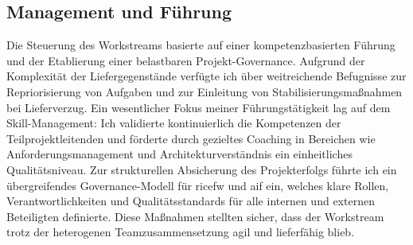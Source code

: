 \subsection{Management und Führung}
\label{subsec:ManagementUndFührung}

\par Die Steuerung des Workstreams basierte auf einer kompetenzbasierten Führung und der Etablierung einer belastbaren Projekt-Governance. Aufgrund der Komplexität der Liefergegenstände verfügte ich über weitreichende Befugnisse zur Repriorisierung von Aufgaben und zur Einleitung von Stabilisierungsmaßnahmen bei Lieferverzug. Ein wesentlicher Fokus meiner Führungstätigkeit lag auf dem Skill-Management: Ich validierte kontinuierlich die Kompetenzen der Teilprojektleitenden und förderte durch gezieltes Coaching in Bereichen wie Anforderungsmanagement und Architekturverständnis ein einheitliches Qualitätsniveau. Zur strukturellen Absicherung des Projekterfolgs führte ich ein übergreifendes Governance-Modell für \gls{ricefw} und \gls{aif} ein, welches klare Rollen, Verantwortlichkeiten und Qualitätsstandards für alle internen und externen Beteiligten definierte. Diese Maßnahmen stellten sicher, dass der Workstream trotz der heterogenen Teamzusammensetzung agil und lieferfähig blieb.


